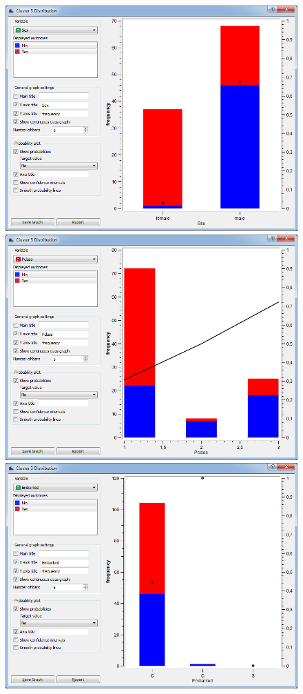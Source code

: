 \documentclass[a4paper,11pt]{article}
\begin{document}
\begin{figure}[h]
	\centering
	\begin{center}
		\includegraphics[scale=0.30]{ClusterDistribution/Cluster3/Sex}
		\includegraphics[scale=0.30]{ClusterDistribution/Cluster3/PClass}\\
		\vspace{1 mm}
		\includegraphics[scale=0.30]{ClusterDistribution/Cluster3/Embarked}

\end{center}
\end{figure}
\end{document}
